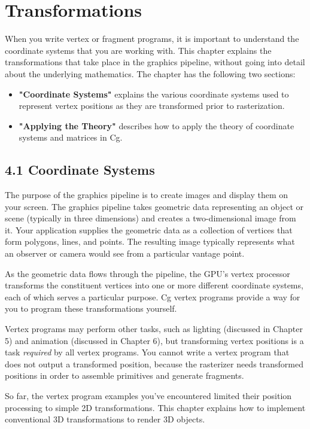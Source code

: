\documentclass[../main.tex]{subfiles}
\begin{document}
\chapter{Transformations}

When you write vertex or fragment programs, it is important to understand the coordinate systems that you are working with. This chapter explains the transformations that take place in the graphics pipeline, without going into detail about the underlying mathematics. The chapter has the following two sections:

\begin{itemize}
\item \textbf{"Coordinate Systems"} explains the various coordinate systems used to represent vertex positions as they are transformed prior to rasterization.
\item \textbf{"Applying the Theory"} describes how to apply the theory of coordinate systems and matrices in Cg.
\end{itemize}

\section{4.1 Coordinate Systems}

The purpose of the graphics pipeline is to create images and display them on your screen. The graphics pipeline takes geometric data representing an object or scene (typically in three dimensions) and creates a two-dimensional image from it. Your application supplies the geometric data as a collection of vertices that form polygons, lines, and points. The resulting image typically represents what an observer or camera would see from a particular vantage point.

As the geometric data flows through the pipeline, the GPU's vertex processor transforms the constituent vertices into one or more different coordinate systems, each of which serves a particular purpose. Cg vertex programs provide a way for you to program these transformations yourself.

Vertex programs may perform other tasks, such as lighting (discussed in Chapter 5) and animation (discussed in Chapter 6), but transforming vertex positions is a task \textit{required} by all vertex programs. You cannot write a vertex program that does not output a transformed position, because the rasterizer needs transformed positions in order to assemble primitives and generate fragments.

So far, the vertex program examples you've encountered limited their position processing to simple 2D transformations. This chapter explains how to implement conventional 3D transformations to render 3D objects.
\end{document}

